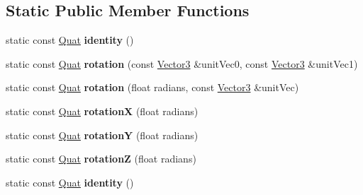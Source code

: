 \subsection*{Static Public Member Functions}
\begin{DoxyCompactItemize}
\item 
\hypertarget{class_vectormath_1_1_aos_1_1_quat_a0666e121d583cab3d661c34f00c18482}{static const \hyperlink{class_vectormath_1_1_aos_1_1_quat}{Quat} {\bfseries identity} ()}\label{class_vectormath_1_1_aos_1_1_quat_a0666e121d583cab3d661c34f00c18482}

\item 
\hypertarget{class_vectormath_1_1_aos_1_1_quat_a6a868e1e4a79743cdfd707fb4edb29b6}{static const \hyperlink{class_vectormath_1_1_aos_1_1_quat}{Quat} {\bfseries rotation} (const \hyperlink{class_vectormath_1_1_aos_1_1_vector3}{Vector3} \&unit\+Vec0, const \hyperlink{class_vectormath_1_1_aos_1_1_vector3}{Vector3} \&unit\+Vec1)}\label{class_vectormath_1_1_aos_1_1_quat_a6a868e1e4a79743cdfd707fb4edb29b6}

\item 
\hypertarget{class_vectormath_1_1_aos_1_1_quat_a856e24fd0405ff0adedc52195b4027b6}{static const \hyperlink{class_vectormath_1_1_aos_1_1_quat}{Quat} {\bfseries rotation} (float radians, const \hyperlink{class_vectormath_1_1_aos_1_1_vector3}{Vector3} \&unit\+Vec)}\label{class_vectormath_1_1_aos_1_1_quat_a856e24fd0405ff0adedc52195b4027b6}

\item 
\hypertarget{class_vectormath_1_1_aos_1_1_quat_a4388b6f41db32fb8e368df5cc72103a6}{static const \hyperlink{class_vectormath_1_1_aos_1_1_quat}{Quat} {\bfseries rotation\+X} (float radians)}\label{class_vectormath_1_1_aos_1_1_quat_a4388b6f41db32fb8e368df5cc72103a6}

\item 
\hypertarget{class_vectormath_1_1_aos_1_1_quat_acd31310808dec804beb0bc2572b29bb4}{static const \hyperlink{class_vectormath_1_1_aos_1_1_quat}{Quat} {\bfseries rotation\+Y} (float radians)}\label{class_vectormath_1_1_aos_1_1_quat_acd31310808dec804beb0bc2572b29bb4}

\item 
\hypertarget{class_vectormath_1_1_aos_1_1_quat_a3c1a75528fe25cb49c4c3c01d7a24b1f}{static const \hyperlink{class_vectormath_1_1_aos_1_1_quat}{Quat} {\bfseries rotation\+Z} (float radians)}\label{class_vectormath_1_1_aos_1_1_quat_a3c1a75528fe25cb49c4c3c01d7a24b1f}

\item 
\hypertarget{class_vectormath_1_1_aos_1_1_quat_ab553fa51545d2a4df531bee913c610dc}{static const \hyperlink{class_vectormath_1_1_aos_1_1_quat}{Quat} {\bfseries identity} ()}\label{class_vectormath_1_1_aos_1_1_quat_ab553fa51545d2a4df531bee913c610dc}


\end{DoxyCompactItemize}
